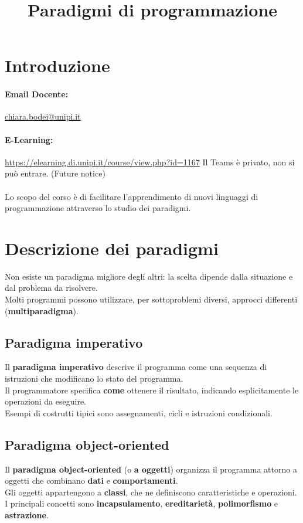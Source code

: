 \documentclass[12pt,a4paper]{article}
\title{Paradigmi di programmazione}
\author{}
\date{}
\let\oldsection\section
\renewcommand{\section}{\clearpage\oldsection}
\begin{document}
\maketitle
\tableofcontents

\section{Introduzione}
\paragraph{Email Docente:} \href{chiara.bodei@unipi.it}{chiara.bodei@unipi.it}
\paragraph{E-Learning:} \href{https://elearning.di.unipi.it/course/view.php?id=1167}{https://elearning.di.unipi.it/course/view.php?id=1167}
Il Teams è privato, non si può entrare. (Future notice)\\\\
Lo scopo del corso è di facilitare l'apprendimento di nuovi linguaggi di programmazione attraverso lo studio dei paradigmi.\\

\section{Descrizione dei paradigmi}
Non esiste un paradigma migliore degli altri: la scelta dipende dalla situazione e dal problema da risolvere.\\
Molti programmi possono utilizzare, per sottoproblemi diversi, approcci differenti (\textbf{multiparadigma}).

\subsection{Paradigma imperativo}
Il \textbf{paradigma imperativo} descrive il programma come una sequenza di istruzioni che modificano lo stato del programma.\\
Il programmatore specifica \textbf{come} ottenere il risultato, indicando esplicitamente le operazioni da eseguire.\\
Esempi di costrutti tipici sono assegnamenti, cicli e istruzioni condizionali.

\subsection{Paradigma object-oriented}
Il \textbf{paradigma object-oriented} (o \textbf{a oggetti}) organizza il programma attorno a oggetti che combinano \textbf{dati} e \textbf{comportamenti}.\\
Gli oggetti appartengono a \textbf{classi}, che ne definiscono caratteristiche e operazioni.\\
I principali concetti sono \textbf{incapsulamento}, \textbf{ereditarietà}, \textbf{polimorfismo} e \textbf{astrazione}.
\end{document}
